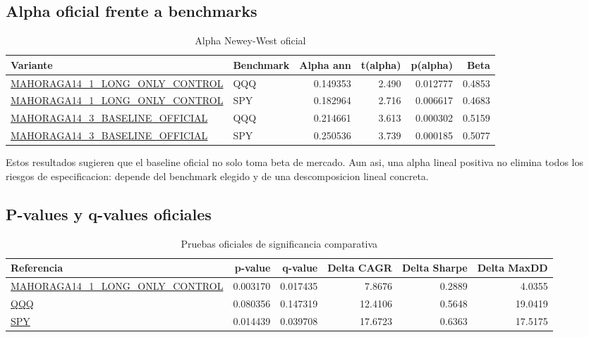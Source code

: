 \documentclass[11pt,letterpaper]{article}
\newcommand{\code}[1]{{\urlstyle{tt}\url{#1}}}
\newcommand{\officiallabel}{\code{MAHORAGA14_3_BASELINE_OFFICIAL}}
\newcommand{\historicalcontrol}{\code{MAHORAGA14_1_LONG_ONLY_CONTROL}}
\begin{document}
\subsection{Alpha oficial frente a benchmarks}
\begin{table}[H]
\centering
\caption{Alpha Newey-West oficial}
\label{tab:alpha-nw}
\begin{adjustbox}{max width=\textwidth}
\begin{tabular}{p{}lrrrr}
\toprule
\textbf{Variante} & \textbf{Benchmark} & \textbf{Alpha ann} & \textbf{t(alpha)} & \textbf{p(alpha)} & \textbf{Beta} \\
\midrule
\historicalcontrol & QQQ & 0.149353 & 2.490 & 0.012777 & 0.4853 \\
\historicalcontrol & SPY & 0.182964 & 2.716 & 0.006617 & 0.4683 \\
\officiallabel & QQQ & 0.214661 & 3.613 & 0.000302 & 0.5159 \\
\officiallabel & SPY & 0.250536 & 3.739 & 0.000185 & 0.5077 \\
\bottomrule
\end{tabular}
\end{adjustbox}
\end{table}

Estos resultados sugieren que el baseline oficial no solo toma beta de mercado. Aun asi, una alpha lineal positiva no elimina todos los riesgos de especificacion: depende del benchmark elegido y de una descomposicion lineal concreta.

\subsection{P-values y q-values oficiales}
\begin{table}[H]
\centering
\caption{Pruebas oficiales de significancia comparativa}
\label{tab:pq}
\begin{adjustbox}{max width=\textwidth}
\begin{tabular}{p{}rrrrr}
\toprule
\textbf{Referencia} & \textbf{p-value} & \textbf{q-value} & \textbf{Delta CAGR} & \textbf{Delta Sharpe} & \textbf{Delta MaxDD} \\
\midrule
\historicalcontrol & 0.003170 & 0.017435 & 7.8676 & 0.2889 & 4.0355 \\
\code{QQQ} & 0.080356 & 0.147319 & 12.4106 & 0.5648 & 19.0419 \\
\code{SPY} & 0.014439 & 0.039708 & 17.6723 & 0.6363 & 17.5175 \\
\bottomrule
\end{tabular}
\end{adjustbox}
\end{table}
\end{document}

